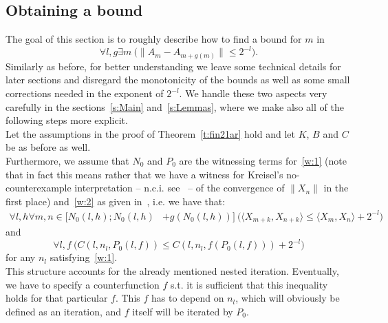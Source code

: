 \subsection{Obtaining a bound}\label{s:terms}
The goal of this section is to roughly describe how to find a bound for $m$ in
\[
\forall l,g \exists m\ \big( \|A_m-A_{m+g(m)}\|\leq 2^{-l} \big).
\]
Similarly as before, for better understanding we leave some technical details
for later sections and disregard the monotonicity of the bounds as well as some
small corrections needed in the exponent of $2^{-l}$.
We handle these two aspects very carefully in the sections~\ref{s:Main} and~\ref{s:Lemmas}, where we make also
all of the following steps more explicit.\\
Let the assumptions in the proof of Theorem~\ref{t:fin21ar} hold and let $K$, 
$B$ and $C$ be as before as well.\\
Furthermore, we assume that $N_0$ and $P_0$ are the witnessing terms for~\eqref{w:1} (note that in
fact this means rather that we have a witness for Kreisel's no-counterexample interpretation -- n.c.i. see~\cite{Kreisel1951, Kreisel1959} -- of the
convergence of $\|X_n\|$ in the first place) and~\eqref{w:2} as given in~\cite{Kohlenbach08}, i.e. we have that:
\begin{align*}
\forall l,h \forall m,n\in[N_0(l,h) ; N_0(l,h)&+g(N_0(l,h))]\ \big( 
\langle X_{m+k},X_{n+k}\rangle \leq \langle X_{m},X_{n}\rangle + 2^{-l} \big)
\end{align*}
and
\[
\forall l,f \ \big( C(l,n_l,P_0(l,f))\leq C(l,n_l,f(P_0(l,f))) + 2^{-l} \big)
\]
for any $n_l$ satisfying~\eqref{w:1}.\\ This structure accounts for the already mentioned nested iteration.  
Eventually, we have to specify a counterfunction $f$ s.t. it is sufficient that this inequality holds for that particular $f$. 
This $f$ has to depend on $n_l$, which will obviously be defined as an iteration, and $f$ itself will be iterated by $P_0$.\\
